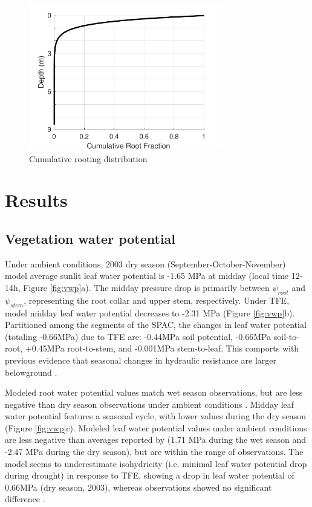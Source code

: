 \documentclass[draft,linenumbers]{agujournal}
\begin{document}
  \begin{figure}[h]
     \centering
     \includegraphics[width=20pc]{../figs3/roots.pdf}
     \caption{Cumulative rooting distribution}
     \label{roots}
  \end{figure}

\section{Results}  
\subsection{Vegetation water potential}

    Under ambient conditions, 2003 dry season (September-October-November) model average sunlit leaf water potential is -1.65 MPa at midday (local time 12-14h, Figure \ref{fig:vwp}a). 
    The midday pressure drop is primarily between $\psi_{root}$ and $\psi_{stem}$, representing the root collar and upper stem, respectively.
    Under TFE, model midday leaf water potential decreases to -2.31 MPa (Figure \ref{fig:vwp}b). 
    Partitioned among the segments of the SPAC, the changes in leaf water potential (totaling -0.66MPa) due to TFE are:
    -0.44MPa soil potential,
    -0.66MPa soil-to-root,
    +0.45MPa root-to-stem, and 
    -0.001MPa stem-to-leaf.
    This comports with previous evidence that seasonal changes in hydraulic resistance are larger belowground \citep{fisher2006}.
    
    Modeled root water potential values match wet season observations, but are less negative than dry season observations under ambient conditions \citep{fisher2006}.
    Midday leaf water potential features a seasonal cycle, with lower values during the dry season (Figure \ref{fig:vwp}c).
    Modeled leaf water potential values under ambient conditions are less negative than averages reported by \cite{fisher2006} (1.71 MPa during the wet season and -2.47 MPa during the dry season), but are within the range of observations.
    The model seems to underestimate isohydricity (i.e. minimal leaf water potential drop during drought) in response to TFE, showing a drop in leaf water potential of 0.66MPa (dry season, 2003), whereas observations showed no significant difference \citep{fisher2006}. 
\end{document}
